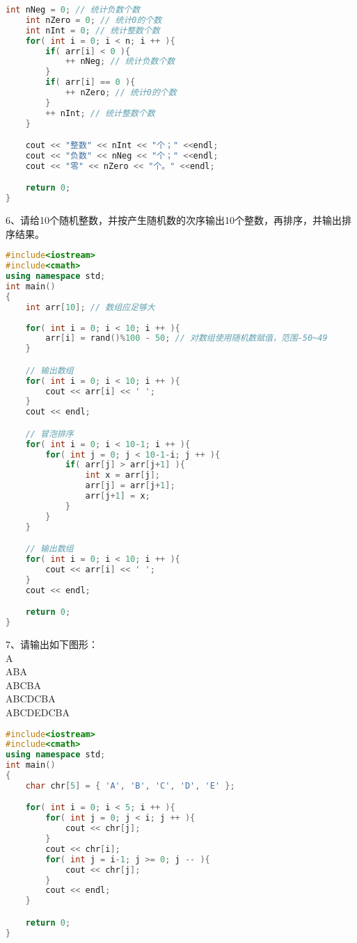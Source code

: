\documentclass[14pt,aps,prb]{revtex4}
\begin{document}
\begin{spacing}{1.5}
\begin{lstlisting}[language=C++]
    int nNeg = 0; // 统计负数个数
    int nZero = 0; // 统计0的个数
    int nInt = 0; // 统计整数个数
    for( int i = 0; i < n; i ++ ){
        if( arr[i] < 0 ){
            ++ nNeg; // 统计负数个数
        }
        if( arr[i] == 0 ){
            ++ nZero; // 统计0的个数
        }
        ++ nInt; // 统计整数个数
    }

    cout << "整数" << nInt << "个；" <<endl;
    cout << "负数" << nNeg << "个；" <<endl;
    cout << "零" << nZero << "个。" <<endl;

    return 0;
}
\end{lstlisting}

6、请给10个随机整数，并按产生随机数的次序输出10个整数，再排序，并输出排序结果。
\begin{lstlisting}[language=C++]
#include<iostream>
#include<cmath>
using namespace std;
int main()
{
    int arr[10]; // 数组应足够大
    
    for( int i = 0; i < 10; i ++ ){
        arr[i] = rand()%100 - 50; // 对数组使用随机数赋值，范围-50~49
    }

    // 输出数组
    for( int i = 0; i < 10; i ++ ){
        cout << arr[i] << ' ';
    }
    cout << endl;

    // 冒泡排序
    for( int i = 0; i < 10-1; i ++ ){
        for( int j = 0; j < 10-1-i; j ++ ){
            if( arr[j] > arr[j+1] ){
                int x = arr[j];
                arr[j] = arr[j+1];
                arr[j+1] = x; 
            }
        }
    }

    // 输出数组
    for( int i = 0; i < 10; i ++ ){
        cout << arr[i] << ' ';
    }
    cout << endl;

    return 0;
}
\end{lstlisting}

7、请输出如下图形：\\
A\\
ABA\\
ABCBA\\
ABCDCBA\\
ABCDEDCBA
\begin{lstlisting}[language=C++]
#include<iostream>
#include<cmath>
using namespace std;
int main()
{
    char chr[5] = { 'A', 'B', 'C', 'D', 'E' };

    for( int i = 0; i < 5; i ++ ){
        for( int j = 0; j < i; j ++ ){
            cout << chr[j];
        }
        cout << chr[i];
        for( int j = i-1; j >= 0; j -- ){
            cout << chr[j];
        }
        cout << endl;
    }

    return 0;
}
\end{lstlisting}


\end{spacing}
\end{document}
